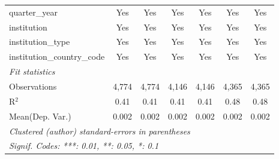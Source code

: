 \begin{tabular}{lcccccc}
   quarter\_year                      & Yes     & Yes      & Yes     & Yes      & Yes     & Yes\\  
   institution                        & Yes     & Yes      & Yes     & Yes      & Yes     & Yes\\  
   institution\_type                  & Yes     & Yes      & Yes     & Yes      & Yes     & Yes\\  
   institution\_country\_code         & Yes     & Yes      & Yes     & Yes      & Yes     & Yes\\  
   \midrule
   \emph{Fit statistics}\\
   Observations                       & 4,774   & 4,774    & 4,146   & 4,146    & 4,365   & 4,365\\  
   R$^2$                              & 0.41    & 0.41     & 0.41    & 0.41     & 0.48    & 0.48\\  
Mean(Dep. Var.) & 0.002 & 0.002 & 0.002 & 0.002 & 0.002 & 0.002 \\
   \midrule \midrule
   \multicolumn{7}{l}{\emph{Clustered (author) standard-errors in parentheses}}\\
   \multicolumn{7}{l}{\emph{Signif. Codes: ***: 0.01, **: 0.05, *: 0.1}}\\
\end{tabular}
\par\endgroup
